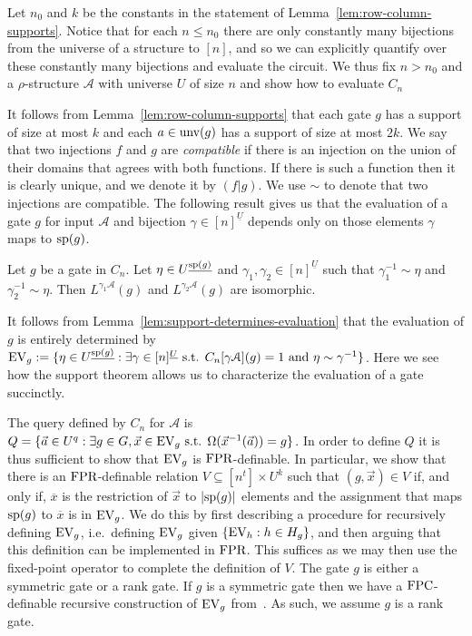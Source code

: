 \documentclass[a4paper,UKenglish]{lipics-v2018}
\begin{document}

Let $n_0$ and $k$ be the constants in the statement of
Lemma~\ref{lem:row-column-supports}. Notice that for each $n \leq n_0$ there are
only constantly many bijections from the universe of a structure to $[n]$, and
so we can explicitly quantify over these constantly many bijections and evaluate
the circuit. We thus fix $n > n_0$ and a $\rho$-structure $\mathcal{A}$ with
universe $U$ of size $n$ and show how to evaluate $C_n$

It follows from Lemma~\ref{lem:row-column-supports} that each gate $g$ has a
support of size at most $k$ and each $a \in \text{unv}(g)$ has a support of size
at most $2k$. We say that two injections $f$ and $g$ are \emph{compatible} if
there is an injection on the union of their domains that agrees with both
functions. If there is such a function then it is clearly unique, and we denote
it by $(f \vert g)$. We use $\sim$ to denote that two injections are compatible.
The following result gives us that the evaluation of a gate $g$ for input
$\mathcal{A}$ and bijection $\gamma \in [n]^{\underline{U}}$ depends only on
those elements $\gamma$ maps to $\text{sp}(g)$.

\begin{lemma}
	Let $g$ be a gate in $C_n$. Let $\eta \in U^{\underline{\text{sp}(g)}}$ and
  $\gamma_1, \gamma_2 \in [n]^{\underline{U}}$ such that $\gamma^{-1}_1 \sim
  \eta$ and $\gamma^{-1}_2 \sim \eta$. Then $L^{\gamma_1 \mathcal{A}}(g)$ and
  $L^{\gamma_2 \mathcal{A}}(g)$ are isomorphic.
	\label{lem:support-determines-evaluation}
\end{lemma}

It follows from Lemma~\ref{lem:support-determines-evaluation} that the
evaluation of $g$ is entirely determined by $\text{EV}_g := \{ \eta \in
U^{\underline{\text{sp}(g)}} : \exists \gamma \in [n]^{\underline{U}}\text{ s.t. }
C_n[\gamma \mathcal{A}](g) = 1 \text{ and } \eta \sim \gamma^{-1}\}$. Here we
see how the support theorem allows us to characterize the evaluation of a gate
succinctly.

The query defined by $C_n$ for $\mathcal{A}$ is $Q = \{ \vec{a} \in U^{q} :
\exists g \in G , \vec{x} \in \text{EV}_g \text{ s.t. } \Omega(\vec{x}^{-1}(\vec{a}))
= g\}$. In order to define $Q$ it is thus sufficient to show that $\text{EV}_g$ is
$\text{\upshape FPR}$-definable. In particular, we show that there is an $\text{\upshape FPR}$-definable
relation $V \subseteq [n^t] \times U^k$ such that $(g, \vec{x}) \in V$ if, and
only if, $\overline{x}$ is the restriction of $\vec{x}$ to $\vert \text{sp}(g)
\vert$ elements and the assignment that maps $\text{sp}(g)$ to $\overline{x}$ is in
$\text{EV}_g$. We do this by first describing a procedure for recursively defining
$\text{EV}_g$, i.e.\ defining $\text{EV}_g$ given $\{\text{EV}_h : h \in H_g \}$, and then arguing
that this definition can be implemented in $\text{\upshape FPR}$. This suffices as we may then
use the fixed-point operator to complete the definition of $V$. The gate $g$ is
either a symmetric gate or a rank gate. If $g$ is a symmetric gate then we have
a $\text{\upshape FPC}$-definable recursive construction of $\text{EV}_g$ from~\cite{AndersonD17}. As
such, we assume $g$ is a rank gate.
\end{document}
